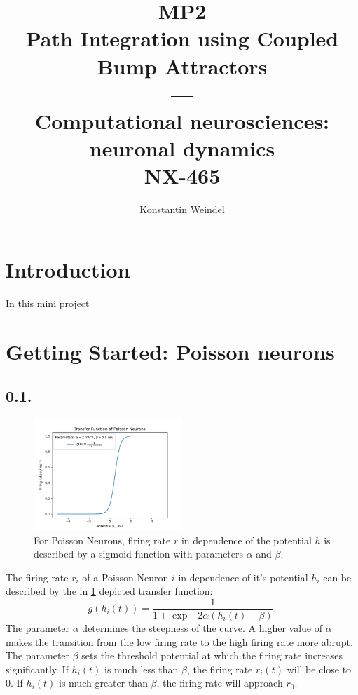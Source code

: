 \documentclass{article}
\title{MP2\\Path Integration using Coupled Bump Attractors\\---\\Computational neurosciences: neuronal dynamics\\NX-465}
\author{Konstantin Weindel}
\begin{document}
\maketitle


\section*{Introduction}
In this mini project 

\section{Getting Started: Poisson neurons}
\subsection*{0.1.}
\begin{figure}[h]
    \centering
    \includegraphics[width=0.5\textwidth]{figures/0.1.transfer_function.png}
    \caption{For Poisson Neurons, firing rate \(r\) in dependence of the potential \(h\) is described by a sigmoid function with parameters \(\alpha\) and \(\beta\).}
    \label{fig:01}
\end{figure}

The firing rate \(r_i\) of a Poisson Neuron \(i\) in dependence of it's potential \(h_i\) can be described by the in \cref{fig:01} depicted transfer function:
\[g(h_i(t)) = \frac{1}{1+\exp{-2\alpha(h_i(t)-\beta)}}.\]
The parameter $\alpha$ determines the steepness of the curve. A higher value of $\alpha$ makes the transition from the low firing rate to the high firing rate more abrupt.
The parameter $\beta$ sets the threshold potential at which the firing rate increases significantly. If $h_i(t)$ is much less than $\beta$, the firing rate $r_i(t)$ will be close to 0. If $h_i(t)$ is much greater than $\beta$, the firing rate will approach $r_0$.
\end{document}
